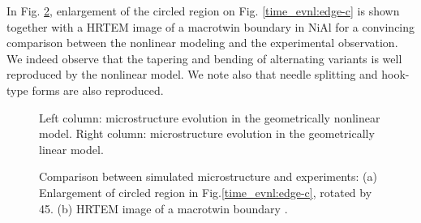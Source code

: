 \documentclass[twocolumn,amsmath,amssymb]{revtex4}
\begin{document}
In Fig. \ref{simuvsexp}, enlargement of the circled region on Fig. \ref{time_evnl:edge-c} is shown together with a HRTEM image of a macrotwin boundary in NiAl \cite{SchBouKohBal01} for a convincing comparison between the nonlinear modeling and the experimental observation. We indeed observe that the tapering and bending of alternating variants is well reproduced by the nonlinear model. We note also that needle splitting and hook-type forms are also reproduced.
% 
 \begin{figure}
\begin{minipage}[b]{0.51\linewidth}
\end{minipage}
\begin{minipage}[b]{0.48\linewidth}
 \end{minipage}
\caption{\label{time_evnl}Left column: microstructure evolution in the geometrically nonlinear model. Right column: microstructure evolution in the geometrically linear model.}
\end{figure}
%
\begin{figure}
\caption {\label{simuvsexp}Comparison between simulated microstructure and experiments: (a) Enlargement of circled region in Fig.\ref{time_evnl:edge-c}, rotated by 45\degree. (b) HRTEM image of a macrotwin boundary \cite{SchBouKohBal01}.} 
\end{figure}
%
%
\end{document}
